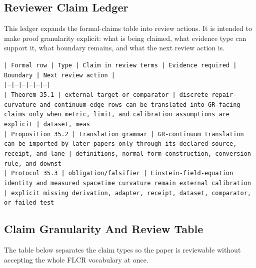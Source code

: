\documentclass[11pt]{article}
\begin{document}
\subsection*{Reviewer Claim Ledger}

This ledger expands the formal-claims table into review actions. It is intended to make proof granularity explicit: what is being claimed, what evidence type can support it, what boundary remains, and what the next review action is.

\noindent\texttt{| Formal row | Type | Claim in review terms | Evidence required | Boundary | Next review action |}\\
\noindent\texttt{|---|---|---|---|---|---|}\\
\noindent\texttt{| Theorem 35.1 | external target or comparator | discrete repair-curvature and continuum-edge rows can be translated into GR-facing claims only when metric, limit, and calibration assumptions are explicit | dataset, meas}\\
\noindent\texttt{| Proposition 35.2 | translation grammar | GR-continuum translation can be imported by later papers only through its declared source, receipt, and lane | definitions, normal-form construction, conversion rule, and downst}\\
\noindent\texttt{| Protocol 35.3 | obligation/falsifier | Einstein-field-equation identity and measured spacetime curvature remain external calibration | explicit missing derivation, adapter, receipt, dataset, comparator, or failed test }\\

\subsection*{Claim Granularity And Review Table}

The table below separates the claim types so the paper is reviewable without accepting the whole FLCR vocabulary at once.
\end{document}
